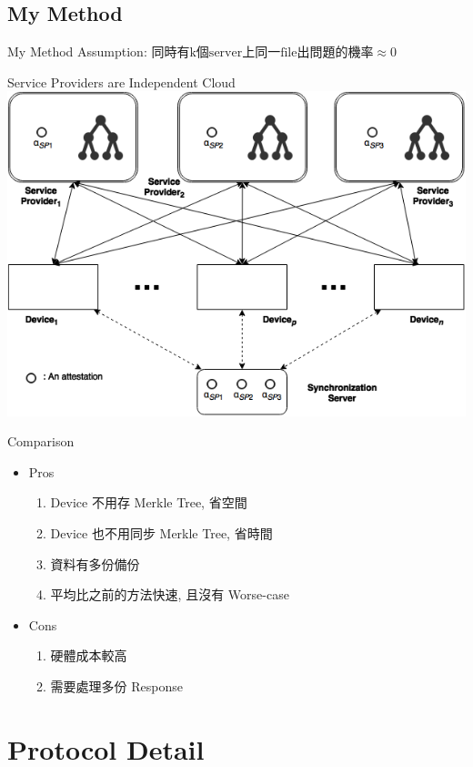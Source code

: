 \documentclass{beamer}
\begin{document}
\begin{CJK}{UTF8}{bkai}
\subsection{\small{My Method}}
\begin{frame}{My Method}
	\color{blue} Assumption: $\text{同時有k個server上同一file出問題的機率} \approx 0$
	\begin{center}
	\alert{Service Providers are Independent Cloud}
	\includegraphics[width=.7\textwidth]{wei_chih.png}
	\end{center}
\end{frame}

\begin{frame}{Comparison}
	\begin{itemize}
		\item Pros
			\begin{enumerate}
				\item Device 不用存 Merkle Tree, 省空間
				\item Device 也不用同步 Merkle Tree, 省時間
				\item 資料有多份備份
				\item 平均比之前的方法快速, 且沒有 Worse-case
			\end{enumerate}
		\item Cons
			\begin{enumerate}
				\item 硬體成本較高
				\item 需要處理多份 Response
			\end{enumerate}
	\end{itemize}
\end{frame}

\section{Protocol Detail}

\end{CJK}
\end{document}
